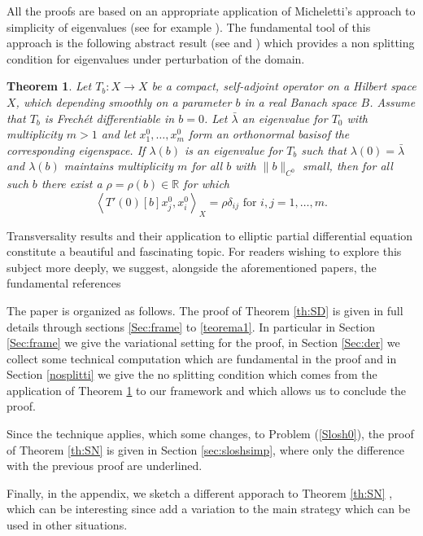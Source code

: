 \documentclass[a4paper,reqno,11pt,oneside]{amsart}
\theoremstyle{plain}
\newtheorem{thm}{Theorem}
\theoremstyle{plain}
\theoremstyle{plain}
\theoremstyle{remark}
\begin{document}
 
All the proofs  are based on an appropriate application of Micheletti's approach to simplicity of eigenvalues (see for example \cite{lupo,mi1,mi2}). The fundamental tool of this approach is the following abstract result (see \cite{mi2} and \cite[Section 3]{fgmp}) which provides a non splitting condition for eigenvalues under perturbation of the domain.

\begin{thm}\label{thm:astratto} 
Let $T_{b}:X\rightarrow X$ be a compact, self-adjoint operator on a Hilbert space $X$, which depending smoothly on a parameter $b$ in a real Banach space $B$. 
Assume that $T_{b}$ is Frechét differentiable in $b=0$. Let $\bar{\lambda}$ an eigenvalue for $T_0$ with multiplicity $m>1$  and let $x_{1}^{0},\dots,x_{m}^{0}$ form an orthonormal basisof the corresponding eigenspace. If  $\lambda(b)$ is an eigenvalue for $T_{b}$ such that $\lambda(0)=\bar\lambda$ and  $\lambda(b)$ maintains multiplicity $m$ for all $b$ with $\|b\|_{C^{0}}$ small, then for all such $b$ there exist a $\rho=\rho(b)\in\mathbb{R}$
for which
\begin{equation}
\left\langle T'(0)[b]x_{j}^{0},x_{i}^{0}\right\rangle _{X}=\rho\delta_{ij}\text{ for }i,j=1,\dots,m.
\label{eq:spezzamentoastratto}
\end{equation}
\end{thm}

Transversality results and their application to elliptic partial differential equation constitute a beautiful and fascinating topic. For readers wishing to explore this subject more deeply, we suggest, alongside the aforementioned papers, the fundamental references \cite{quinn, Saut-Temam,Smale,u2} 

The paper is organized as follows. The proof of Theorem \ref{th:SD} is given in full details through sections \ref{Sec:frame} to \ref{teorema1}. In particular in Section \ref{Sec:frame} we give the variational setting for the proof, in Section 
 \ref{Sec:der} we collect some technical computation which are fundamental in the proof and in Section \ref{nosplitti} we give the no splitting condition which comes from the application of Theorem \ref{thm:astratto} to our framework and which allows us to conclude the proof.

 Since the technique applies, which some changes, to Problem (\ref{Slosh0}), the proof of Theorem \ref{th:SN} is given in Section \ref{sec:sloshsimp}, where only the difference with the previous proof are underlined.

 Finally, in the appendix, we sketch a different apporach to Theorem  \ref{th:SN} , which can be interesting since add a variation to the main strategy which can be used in other situations.
 
\end{document}
